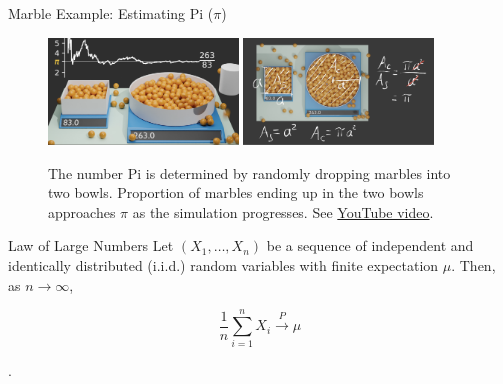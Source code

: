 \documentclass[english]{beamer}\usepackage[]{graphicx}\usepackage[]{xcolor}
\begin{document}
\begin{frame}{Marble Example: Estimating Pi (\(\pi\))}

\begin{figure}
  \includegraphics[width=0.45\textwidth]{marble}
  \hspace{0.5cm} %
  \includegraphics[width=0.45\textwidth]{marble2}
  \caption{The number Pi is determined by randomly dropping marbles into two bowls. Proportion of marbles ending up in the two bowls approaches \(\pi\) as the simulation progresses. See \href{https://www.youtube.com/watch?v=7ESK5SaP-bc}{YouTube video}.}
\end{figure}
\end{frame}

\begin{frame}{Law of Large Numbers}
Let \((X_1, \ldots, X_n)\) be a sequence of independent and identically distributed (i.i.d.) random variables with finite expectation \(\mu\). Then, as \(n \rightarrow \infty\),

\[
\frac{1}{n} \sum_{i=1}^{n} X_i \overset{P}{\rightarrow} \mu
\]

\cite{held2014}.


\end{frame}
\end{document}
